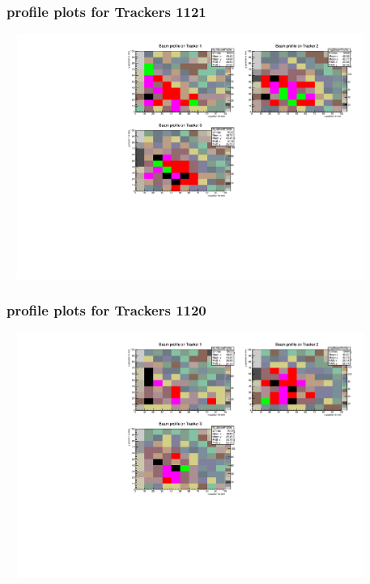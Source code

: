 \documentclass[slidestop,compress,mathserif]{beamer}
\begin{document}
\begin{frame}\frametitle{profile plots for Trackers 1121}
	 \includegraphics[width=12cm,height=8cm]{profile_plots_for_Trackers_1121.pdf}
\end{frame}
\begin{frame}\frametitle{profile plots for Trackers 1120}
	 \includegraphics[width=12cm,height=8cm]{profile_plots_for_Trackers_1120.pdf}
\end{frame}
\end{document}
